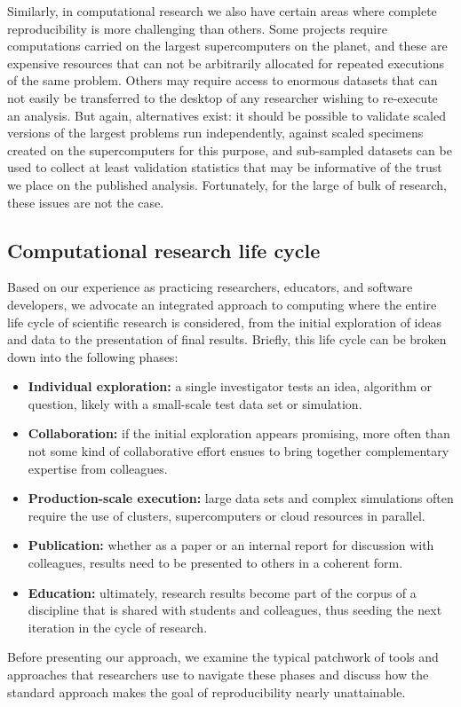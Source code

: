 \documentclass[ChapterTOCs,krantz2]{krantz} %
\begin{document}
Similarly, in computational research we also have certain areas where
complete reproducibility is more challenging than others. Some projects
require computations carried on the largest supercomputers on the
planet, and these are expensive resources that can not be arbitrarily
allocated for repeated executions of the same problem. Others may
require access to enormous datasets that can not easily be transferred
to the desktop of any researcher wishing to re-execute an analysis.
But again, alternatives exist: it should be possible to validate scaled
versions of the largest problems run independently, against scaled
specimens created on the supercomputers for this purpose, and
sub-sampled datasets can be used to collect at least validation statistics
that may be informative of the trust we place on the published analysis.
Fortunately, for the large of bulk of research, these issues are not
the case.

\subsection{Computational research life cycle}

Based on our experience as practicing researchers, educators, and software
developers, we advocate an integrated approach to computing where the entire
life cycle of scientific research is considered, from the initial exploration
of ideas and data to the presentation of final results.  Briefly, this life
cycle can be broken down into the following phases:

\begin{itemize}
\item \textbf{Individual exploration:} a single investigator tests an idea,
  algorithm or question, likely with a small-scale test data set or simulation.
\item \textbf{Collaboration:} if the initial exploration appears promising,
  more often than not some kind of collaborative effort ensues to bring
  together complementary expertise from colleagues.
\item \textbf{Production-scale execution:} large data sets and complex
  simulations often require the use of clusters, supercomputers or cloud
  resources in parallel.
\item \textbf{Publication:} whether as a paper or an internal report for
  discussion with colleagues, results need to be presented to others in a
  coherent form.
\item \textbf{Education:} ultimately, research results become part of the
  corpus of a discipline that is shared with students and colleagues, thus
  seeding the next iteration in the cycle of research.
\end{itemize}
Before presenting our approach, we examine the typical patchwork of tools and
approaches that researchers use to navigate these phases and discuss how the
standard approach makes the goal of reproducibility nearly unattainable.
\end{document}
